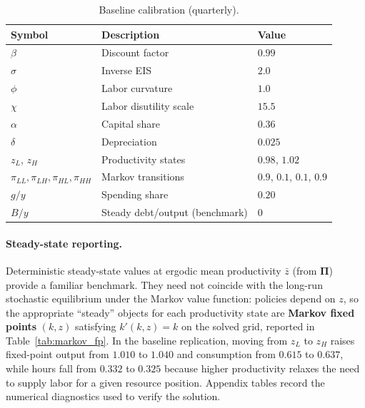 \documentclass[11pt,a4paper]{article}
\begin{document}
\begin{table}[htbp]
  \centering
  \caption{Baseline calibration (quarterly).}
  \label{tab:calib}
  \begin{tabular}{@{}lll@{}}
    \toprule
    Symbol & Description & Value \\
    \midrule
    $\beta$ & Discount factor & $0.99$ \\
    $\sigma$ & Inverse EIS & $2.0$ \\
    $\phi$ & Labor curvature & $1.0$ \\
    $\chi$ & Labor disutility scale & $15.5$ \\
    $\alpha$ & Capital share & $0.36$ \\
    $\delta$ & Depreciation & $0.025$ \\
    $z_L$, $z_H$ & Productivity states & $0.98$, $1.02$ \\
    $\pi_{LL},\pi_{LH},\pi_{HL},\pi_{HH}$ & Markov transitions & $0.9$, $0.1$, $0.1$, $0.9$ \\
    $g/y$ & Spending share & $0.20$ \\
    $B/y$ & Steady debt/output (benchmark) & $0$ \\
    \bottomrule
  \end{tabular}
\end{table}

\paragraph{Steady-state reporting.}
Deterministic steady-state values at ergodic mean productivity $\bar z$ (from $\bm{\Pi}$) provide a familiar benchmark. They need not coincide with the long-run stochastic equilibrium under the Markov value function: policies depend on $z$, so the appropriate ``steady'' objects for each productivity state are \textbf{Markov fixed points} $(k,z)$ satisfying $k'(k,z)=k$ on the solved grid, reported in Table~\ref{tab:markov_fp}. In the baseline replication, moving from $z_L$ to $z_H$ raises fixed-point output from $1.010$ to $1.040$ and consumption from $0.615$ to $0.637$, while hours fall from $0.332$ to $0.325$ because higher productivity relaxes the need to supply labor for a given resource position. Appendix tables record the numerical diagnostics used to verify the solution.
\end{document}
